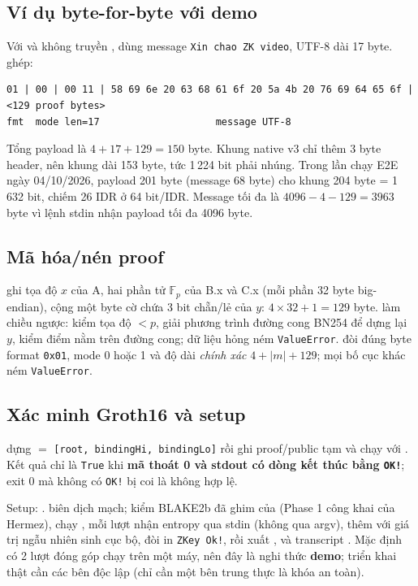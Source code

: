 \documentclass[11pt,a4paper]{article}
\begin{document}
\subsection{Ví dụ byte-for-byte với demo}

Với  và không truyền ,  dùng message
\texttt{Xin chao ZK video}, UTF-8 dài 17 byte.  ghép:
\begin{lstlisting}[numbers=none]
01 | 00 | 00 11 | 58 69 6e 20 63 68 61 6f 20 5a 4b 20 76 69 64 65 6f | <129 proof bytes>
fmt  mode len=17                    message UTF-8
\end{lstlisting}
Tổng payload là $4+17+129=150$ byte. Khung native v3 chỉ thêm 3 byte header, nên khung
dài 153 byte, tức 1\,224 bit phải nhúng. Trong lần chạy E2E ngày 04/10/2026, payload
201 byte (message 68 byte) cho khung 204 byte = 1\,632 bit, chiếm 26 IDR ở 64 bit/IDR.
Message tối đa là $4096-4-129=3963$ byte vì lệnh stdin nhận payload tối đa 4096 byte.

\subsection{Mã hóa/nén proof}

 ghi tọa độ $x$ của A, hai phần tử $\mathbb{F}_{p}$ của
B.x và C.x (mỗi phần 32 byte big-endian), cộng một byte cờ chứa 3 bit chẵn/lẻ của
$y$: $4\times32+1=129$ byte.  làm chiều ngược: kiểm tọa độ
$<p$, giải phương trình đường cong BN254 để dựng lại $y$, kiểm điểm nằm trên đường
cong; dữ liệu hỏng ném \texttt{ValueError}.  đòi đúng byte
format \texttt{0x01}, mode 0 hoặc 1 và độ dài \emph{chính xác} $4+|m|+129$; mọi bố cục
khác ném \texttt{ValueError}.

\subsection{Xác minh Groth16 và setup}

 dựng
 $=$ \texttt{[root, bindingHi, bindingLo]} rồi
 ghi proof/public tạm và chạy 
với . Kết quả chỉ là \texttt{True} khi \textbf{mã thoát 0
và stdout có dòng kết thúc bằng \texttt{OK!}}; exit 0 mà không có \texttt{OK!} bị coi
là không hợp lệ.

Setup: .  biên dịch mạch;
 kiểm BLAKE2b đã ghim của 
(Phase 1 công khai của Hermez), chạy , mỗi lượt
 nhận entropy qua stdin (không qua argv), thêm
 với giá trị ngẫu nhiên sinh cục bộ, đòi  in
\texttt{ZKey Ok!}, rồi xuất ,  và
transcript . Mặc định có 2 lượt đóng góp
chạy trên một máy, nên đây là nghi thức \textbf{demo}; triển khai thật cần các bên độc
lập (chỉ cần một bên trung thực là khóa an toàn).
\end{document}
